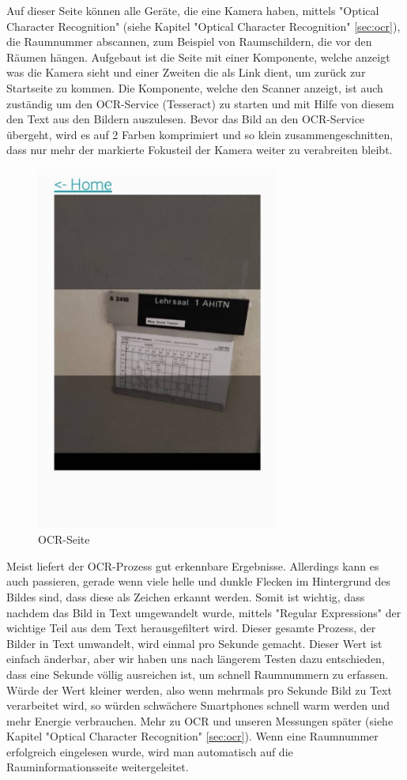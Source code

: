 
Auf dieser Seite können alle Geräte, die eine Kamera haben, mittels "Optical Character Recognition" (siehe Kapitel "Optical Character Recognition" \ref{sec:ocr}), die Raumnummer abscannen, zum Beispiel von Raumschildern, die vor den Räumen hängen. Aufgebaut ist die Seite mit einer Komponente, welche anzeigt was die Kamera sieht und einer Zweiten die als Link dient, um zurück zur Startseite zu kommen. Die Komponente, welche den Scanner anzeigt, ist auch zuständig um den OCR-Service (Tesseract) zu starten und mit Hilfe von diesem den Text aus den Bildern auszulesen. Bevor das Bild an den OCR-Service übergeht, wird es auf 2 Farben komprimiert und so klein zusammengeschnitten, dass nur mehr der markierte Fokusteil der Kamera weiter zu verabreiten bleibt.

\begin{figure}[H]
    \centering
    \includegraphics[width=80mm]{media/WebComponents/OCRSeite_light.jpg}
    \caption{OCR-Seite}
\end{figure}


Meist liefert der OCR-Prozess gut erkennbare Ergebnisse. Allerdings kann es auch passieren, gerade wenn viele helle und dunkle Flecken im Hintergrund des Bildes sind, dass diese als Zeichen erkannt werden. Somit ist wichtig, dass nachdem das Bild in Text umgewandelt wurde, mittels "Regular Expressions" der wichtige Teil aus dem Text herausgefiltert wird. Dieser gesamte Prozess, der Bilder in Text umwandelt, wird einmal pro Sekunde gemacht. Dieser Wert ist einfach änderbar, aber wir haben uns nach längerem Testen dazu entschieden, dass eine Sekunde völlig ausreichen ist, um schnell Raumnummern zu erfassen. Würde der Wert kleiner werden, also wenn mehrmals pro Sekunde Bild zu Text verarbeitet wird, so würden schwächere Smartphones schnell warm werden und mehr Energie verbrauchen. Mehr zu OCR und unseren Messungen später (siehe Kapitel "Optical Character Recognition" \ref{sec:ocr}). Wenn eine Raumnummer erfolgreich eingelesen wurde, wird man automatisch auf die Rauminformationsseite weitergeleitet.

